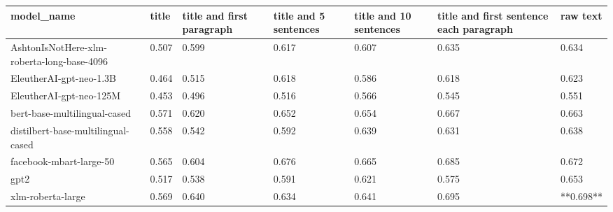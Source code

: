 \begin{tabular}{lllllll}
\toprule
                                model\_name & title & title and first paragraph & title and 5 sentences & title and 10 sentences & title and first sentence each paragraph &  raw text \\
\midrule
AshtonIsNotHere-xlm-roberta-long-base-4096 & 0.507 &                     0.599 &                 0.617 &                  0.607 &                                   0.635 &     0.634 \\
                   EleutherAI-gpt-neo-1.3B & 0.464 &                     0.515 &                 0.618 &                  0.586 &                                   0.618 &     0.623 \\
                   EleutherAI-gpt-neo-125M & 0.453 &                     0.496 &                 0.516 &                  0.566 &                                   0.545 &     0.551 \\
              bert-base-multilingual-cased & 0.571 &                     0.620 &                 0.652 &                  0.654 &                                   0.667 &     0.663 \\
        distilbert-base-multilingual-cased & 0.558 &                     0.542 &                 0.592 &                  0.639 &                                   0.631 &     0.638 \\
                   facebook-mbart-large-50 & 0.565 &                     0.604 &                 0.676 &                  0.665 &                                   0.685 &     0.672 \\
                                      gpt2 & 0.517 &                     0.538 &                 0.591 &                  0.621 &                                   0.575 &     0.653 \\
                         xlm-roberta-large & 0.569 &                     0.640 &                 0.634 &                  0.641 &                                   0.695 & **0.698** \\
\bottomrule
\end{tabular}
